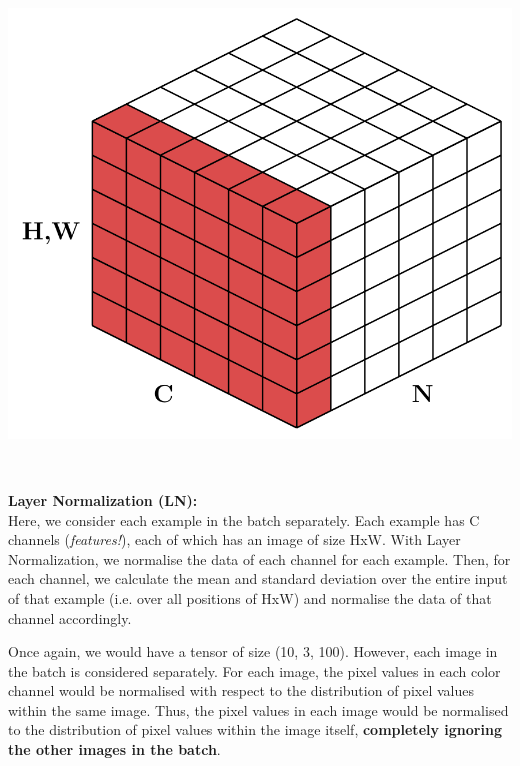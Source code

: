 \begin{minipage}{0.55\textwidth}
\includegraphics[width=\textwidth]{tikz/chapter3 - Layer Norm.pdf}
\end{minipage}
\begin{minipage}{0.05\textwidth}
\ 
\end{minipage}
\begin{minipage}{0.4\textwidth}
\textbf{\textcolor{myred!70}{Layer Normalization (LN):}} \\

Here, we consider each example in the batch separately. Each example has C channels (\textit{features!}), each of which has an image of size HxW. With Layer Normalization, we normalise the data of each channel for each example. Then, for each channel, we calculate the mean and standard deviation over the entire input of that example (i.e. over all positions of HxW) and normalise the data of that channel accordingly.
\end{minipage}

Once again, we would have a tensor of size (10, 3, 100).
However, each image in the batch is considered separately. For each image, the pixel values in each color channel would be normalised with respect to the distribution of pixel values within the same image.
Thus, the pixel values in each image would be normalised to the distribution of pixel values within the image itself, \textbf{completely ignoring the other images in the batch}.


